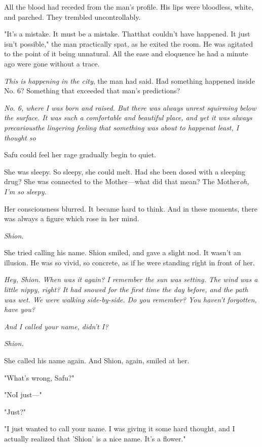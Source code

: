 All the blood had receded from the man's profile. His lips were
bloodless, white, and parched. They trembled uncontrollably.

"It's a mistake. It must be a mistake. That\el that couldn't have
happened. It just isn't possible," the man practically spat, as he
exited the room. He was agitated to the point of it being unnatural. All
the ease and eloquence he had a minute ago were gone without a trace.

\emph{This is happening in the city}, the man had said. Had something happened
inside No. 6? Something that exceeded that man's predictions\el ?

\emph{No. 6, where I was born and raised. But there was always unrest
squirming below the surface. It was such a comfortable and beautiful
place, and yet it was always precarious\el the lingering feeling that
something was about to happen\el at least, I thought so\el }

Safu could feel her rage gradually begin to quiet.

She was sleepy. So sleepy, she could melt. Had she been dosed with a
sleeping drug? She was connected to the Mother---what did that mean? The
Mother\el \emph{oh, I'm so sleepy.}

Her consciousness blurred. It became hard to think. And in these
moments, there was always a figure which rose in her mind.

\emph{Shion.}

She tried calling his name. Shion smiled, and gave a slight nod. It
wasn't an illusion. He was so vivid, so concrete, as if he were standing
right in front of her.

\emph{Hey, Shion. When was it again? I remember the sun was setting. The wind
was a little nippy, right? It had snowed for the first time the day
before, and the path was wet. We were walking side-by-side. Do you
remember? You haven't forgotten, have you?}

\emph{And I called your name, didn't I?}

\emph{Shion.}

\mybreak

She called his name again. And Shion, again, smiled at her.

"What's wrong, Safu?"

"No\el I just---"

"Just?"

"I just wanted to call your name. I was giving it some hard thought, and
I actually realized that 'Shion' is a nice name. It's a flower."

